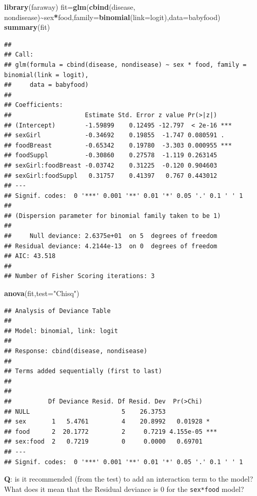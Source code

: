 \documentclass[
  ignorenonframetext,
]{beamer}
\newenvironment{Shaded}{\begin{snugshade}}{\end{snugshade}}
\newcommand{\AttributeTok}[1]{\textcolor[rgb]{0.13,0.29,0.53}{#1}}
\newcommand{\FunctionTok}[1]{\textcolor[rgb]{0.13,0.29,0.53}{\textbf{#1}}}
\newcommand{\NormalTok}[1]{#1}
\newcommand{\OtherTok}[1]{\textcolor[rgb]{0.56,0.35,0.01}{#1}}
\newcommand{\SpecialCharTok}[1]{\textcolor[rgb]{0.81,0.36,0.00}{\textbf{#1}}}
\newcommand{\StringTok}[1]{\textcolor[rgb]{0.31,0.60,0.02}{#1}}
\begin{document}
\begin{frame}[fragile]
\footnotesize

\begin{Shaded}
\begin{Highlighting}[]
\FunctionTok{library}\NormalTok{(faraway)}
\NormalTok{fit}\OtherTok{=}\FunctionTok{glm}\NormalTok{(}\FunctionTok{cbind}\NormalTok{(disease, nondisease)}\SpecialCharTok{\textasciitilde{}}\NormalTok{sex}\SpecialCharTok{*}\NormalTok{food,}\AttributeTok{family=}\FunctionTok{binomial}\NormalTok{(}\AttributeTok{link=}\NormalTok{logit),}\AttributeTok{data=}\NormalTok{babyfood)}
\FunctionTok{summary}\NormalTok{(fit)}
\end{Highlighting}
\end{Shaded}

\begin{verbatim}
## 
## Call:
## glm(formula = cbind(disease, nondisease) ~ sex * food, family = binomial(link = logit), 
##     data = babyfood)
## 
## Coefficients:
##                    Estimate Std. Error z value Pr(>|z|)    
## (Intercept)        -1.59899    0.12495 -12.797  < 2e-16 ***
## sexGirl            -0.34692    0.19855  -1.747 0.080591 .  
## foodBreast         -0.65342    0.19780  -3.303 0.000955 ***
## foodSuppl          -0.30860    0.27578  -1.119 0.263145    
## sexGirl:foodBreast -0.03742    0.31225  -0.120 0.904603    
## sexGirl:foodSuppl   0.31757    0.41397   0.767 0.443012    
## ---
## Signif. codes:  0 '***' 0.001 '**' 0.01 '*' 0.05 '.' 0.1 ' ' 1
## 
## (Dispersion parameter for binomial family taken to be 1)
## 
##     Null deviance: 2.6375e+01  on 5  degrees of freedom
## Residual deviance: 4.2144e-13  on 0  degrees of freedom
## AIC: 43.518
## 
## Number of Fisher Scoring iterations: 3
\end{verbatim}

\begin{Shaded}
\begin{Highlighting}[]
\FunctionTok{anova}\NormalTok{(fit,}\AttributeTok{test=}\StringTok{"Chisq"}\NormalTok{)}
\end{Highlighting}
\end{Shaded}

\begin{verbatim}
## Analysis of Deviance Table
## 
## Model: binomial, link: logit
## 
## Response: cbind(disease, nondisease)
## 
## Terms added sequentially (first to last)
## 
## 
##          Df Deviance Resid. Df Resid. Dev  Pr(>Chi)    
## NULL                         5    26.3753              
## sex       1   5.4761         4    20.8992   0.01928 *  
## food      2  20.1772         2     0.7219 4.155e-05 ***
## sex:food  2   0.7219         0     0.0000   0.69701    
## ---
## Signif. codes:  0 '***' 0.001 '**' 0.01 '*' 0.05 '.' 0.1 ' ' 1
\end{verbatim}

\normalsize

\textbf{Q}: is it recommended (from the test) to add an interaction term
to the model? What does it mean that the Residual deviance is 0 for the
\texttt{sex*food} model?
\end{frame}
\end{document}
